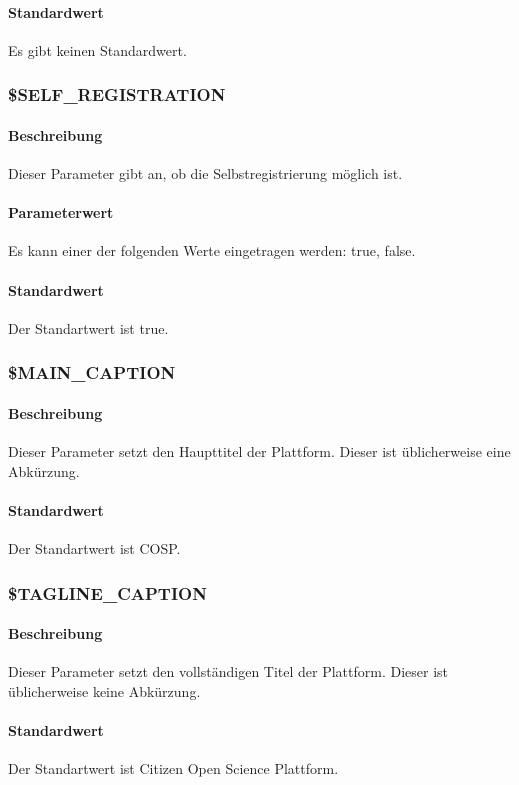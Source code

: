 \paragraph{Standardwert}Es gibt keinen Standardwert.

\subsubsection{\$SELF\_REGISTRATION}
\paragraph{Beschreibung}Dieser Parameter gibt an, ob die Selbstregistrierung möglich ist.
\paragraph{Parameterwert}Es kann einer der folgenden Werte eingetragen werden: {\glqq true\grqq}, {\glqq false\grqq}.
\paragraph{Standardwert}Der Standartwert ist {\glqq true\grqq}.

\subsubsection{\$MAIN\_CAPTION}
\paragraph{Beschreibung}Dieser Parameter setzt den Haupttitel der Plattform. Dieser ist üblicherweise eine Abkürzung.
\paragraph{Standardwert}Der Standartwert ist {\glqq COSP\grqq}.

\subsubsection{\$TAGLINE\_CAPTION}
\paragraph{Beschreibung}Dieser Parameter setzt den vollständigen Titel der Plattform. Dieser ist üblicherweise keine Abkürzung.
\paragraph{Standardwert}Der Standartwert ist {\glqq Citizen Open Science Plattform\grqq}.

